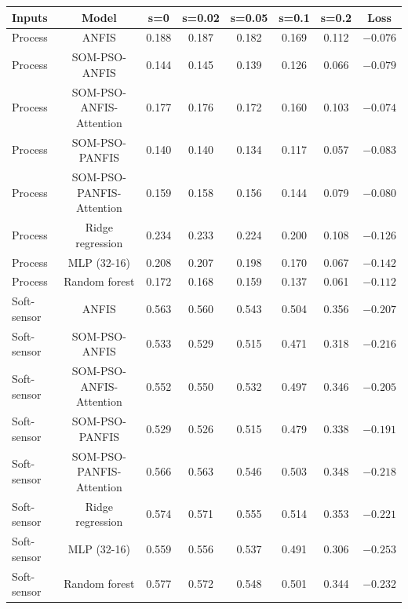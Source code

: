 \begin{tabular}{lccccccc}
\hline
Inputs & Model & s=0 & s=0.02 & s=0.05 & s=0.1 & s=0.2 & Loss \\
\hline
Process & ANFIS & 0.188 & 0.187 & 0.182 & 0.169 & 0.112 & $-0.076$ \\
Process & SOM-PSO-ANFIS & 0.144 & 0.145 & 0.139 & 0.126 & 0.066 & $-0.079$ \\
Process & SOM-PSO-ANFIS-Attention & 0.177 & 0.176 & 0.172 & 0.160 & 0.103 & $-0.074$ \\
Process & SOM-PSO-PANFIS & 0.140 & 0.140 & 0.134 & 0.117 & 0.057 & $-0.083$ \\
Process & SOM-PSO-PANFIS-Attention & 0.159 & 0.158 & 0.156 & 0.144 & 0.079 & $-0.080$ \\
Process & Ridge regression & 0.234 & 0.233 & 0.224 & 0.200 & 0.108 & $-0.126$ \\
Process & MLP (32-16) & 0.208 & 0.207 & 0.198 & 0.170 & 0.067 & $-0.142$ \\
Process & Random forest & 0.172 & 0.168 & 0.159 & 0.137 & 0.061 & $-0.112$ \\
\hline
Soft-sensor & ANFIS & 0.563 & 0.560 & 0.543 & 0.504 & 0.356 & $-0.207$ \\
Soft-sensor & SOM-PSO-ANFIS & 0.533 & 0.529 & 0.515 & 0.471 & 0.318 & $-0.216$ \\
Soft-sensor & SOM-PSO-ANFIS-Attention & 0.552 & 0.550 & 0.532 & 0.497 & 0.346 & $-0.205$ \\
Soft-sensor & SOM-PSO-PANFIS & 0.529 & 0.526 & 0.515 & 0.479 & 0.338 & $-0.191$ \\
Soft-sensor & SOM-PSO-PANFIS-Attention & 0.566 & 0.563 & 0.546 & 0.503 & 0.348 & $-0.218$ \\
Soft-sensor & Ridge regression & 0.574 & 0.571 & 0.555 & 0.514 & 0.353 & $-0.221$ \\
Soft-sensor & MLP (32-16) & 0.559 & 0.556 & 0.537 & 0.491 & 0.306 & $-0.253$ \\
Soft-sensor & Random forest & 0.577 & 0.572 & 0.548 & 0.501 & 0.344 & $-0.232$ \\
\hline
\end{tabular}
